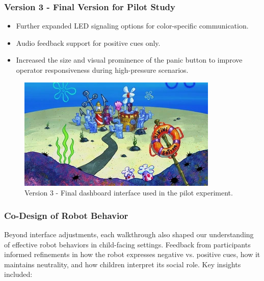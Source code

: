 \documentclass[a4paper]{usiinfbachelorproject}
\begin{document}
\subsubsection*{\textbf{Version 3 - Final Version for Pilot Study}}
\begin{itemize}
    \item Further expanded LED signaling options for color-specific communication.
    \item Audio feedback support for positive cues only.
    \item Increased the size and visual prominence of the panic button to improve operator responsiveness during high-pressure scenarios.
\end{itemize}
\begin{figure}[H]
    \centering
    \includegraphics[width=0.8\linewidth]{figures/todo.png}
    \caption{Version 3 - Final dashboard interface used in the pilot experiment.}
    \label{fig:dashboard-v3}
\end{figure}

\subsubsection*{\textbf{Co-Design of Robot Behavior}}

Beyond interface adjustments, each walkthrough also shaped our understanding of effective robot behaviors in child-facing settings.
Feedback from participants informed refinements in how the robot expresses negative vs. positive cues, how it maintains neutrality, and how children interpret its social role.
Key insights included:
\end{document}

